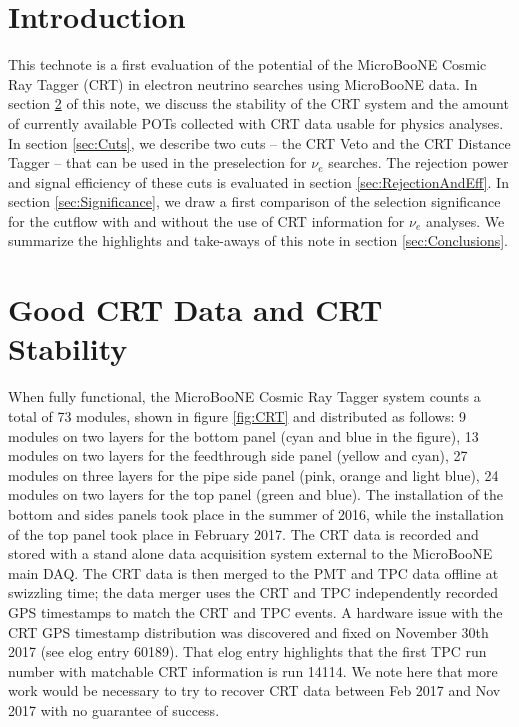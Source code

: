 \section{Introduction}\label{sec:Introduction}
This technote is a first evaluation of the potential of the MicroBooNE Cosmic Ray Tagger (CRT) in electron neutrino searches using MicroBooNE data.  In section \ref{sec:Stability} of this note, we discuss the stability of the CRT system and the amount of  currently available POTs collected with CRT data usable for physics analyses. In section \ref{sec:Cuts}, we describe two cuts -- the CRT Veto and the CRT Distance Tagger -- that can be used in  the  preselection for $\nu_e$ searches. The rejection power and signal efficiency of these cuts is evaluated in section \ref{sec:RejectionAndEff}. In section \ref{sec:Significance}, we draw a first comparison of the selection significance for the cutflow with and without the use of CRT information for $\nu_e$ analyses. We summarize the highlights and take-aways of this note in section \ref{sec:Conclusions}. 

\section{Good CRT Data and CRT Stability}\label{sec:Stability}
When fully functional, the MicroBooNE Cosmic Ray Tagger system counts a total of 73 modules, shown in figure \ref{fig:CRT} and distributed as follows: 9 modules on two layers for the bottom panel (cyan and blue in the figure), 13 modules on two layers for the feedthrough side panel (yellow and cyan),  27 modules on three layers for the pipe side panel (pink, orange and light blue),  24 modules on two layers for the top panel (green and blue).  The installation of the bottom and sides panels took place in the summer of 2016, while the installation of the top panel took place in February 2017. 
The CRT data is recorded and stored with a stand alone data acquisition system external to the MicroBooNE main DAQ. The CRT data is then merged to the PMT and TPC data offline at swizzling time; the data merger uses the CRT and TPC independently recorded GPS timestamps to match the CRT and TPC events. A hardware issue with the CRT GPS timestamp distribution was discovered and fixed on November 30th 2017 (see elog entry 60189). That elog entry highlights that the first TPC run number with matchable CRT information is run 14114.  We note here that more work would be necessary to try to recover CRT data between Feb 2017 and Nov 2017 with no guarantee of success. 


